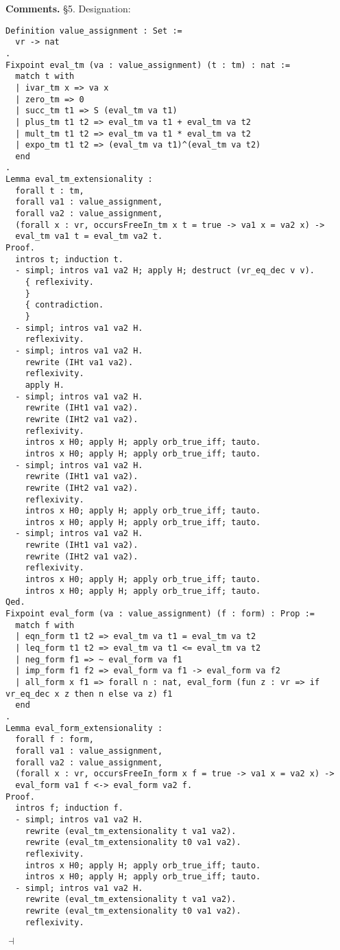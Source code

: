 \documentclass[12pt]{paper}
\newenvironment{context}[1][]{\noindent \textbf{{#1}.}}{\hfill $ \dashv $}
\begin{document}
\begin{context}[Comments]
    \S5. Designation:
\begin{lstlisting}[frame=single]
Definition value_assignment : Set :=
  vr -> nat
.
Fixpoint eval_tm (va : value_assignment) (t : tm) : nat :=
  match t with
  | ivar_tm x => va x
  | zero_tm => 0
  | succ_tm t1 => S (eval_tm va t1)
  | plus_tm t1 t2 => eval_tm va t1 + eval_tm va t2
  | mult_tm t1 t2 => eval_tm va t1 * eval_tm va t2
  | expo_tm t1 t2 => (eval_tm va t1)^(eval_tm va t2)
  end
.
Lemma eval_tm_extensionality :
  forall t : tm,
  forall va1 : value_assignment,
  forall va2 : value_assignment,
  (forall x : vr, occursFreeIn_tm x t = true -> va1 x = va2 x) ->
  eval_tm va1 t = eval_tm va2 t.
Proof.
  intros t; induction t.
  - simpl; intros va1 va2 H; apply H; destruct (vr_eq_dec v v).
    { reflexivity.
    }
    { contradiction.
    }
  - simpl; intros va1 va2 H.
    reflexivity.
  - simpl; intros va1 va2 H.
    rewrite (IHt va1 va2).
    reflexivity.
    apply H.
  - simpl; intros va1 va2 H.
    rewrite (IHt1 va1 va2).
    rewrite (IHt2 va1 va2).
    reflexivity.
    intros x H0; apply H; apply orb_true_iff; tauto.
    intros x H0; apply H; apply orb_true_iff; tauto.
  - simpl; intros va1 va2 H.
    rewrite (IHt1 va1 va2).
    rewrite (IHt2 va1 va2).
    reflexivity.
    intros x H0; apply H; apply orb_true_iff; tauto.
    intros x H0; apply H; apply orb_true_iff; tauto.
  - simpl; intros va1 va2 H.
    rewrite (IHt1 va1 va2).
    rewrite (IHt2 va1 va2).
    reflexivity.
    intros x H0; apply H; apply orb_true_iff; tauto.
    intros x H0; apply H; apply orb_true_iff; tauto.
Qed.
Fixpoint eval_form (va : value_assignment) (f : form) : Prop :=
  match f with
  | eqn_form t1 t2 => eval_tm va t1 = eval_tm va t2
  | leq_form t1 t2 => eval_tm va t1 <= eval_tm va t2
  | neg_form f1 => ~ eval_form va f1
  | imp_form f1 f2 => eval_form va f1 -> eval_form va f2
  | all_form x f1 => forall n : nat, eval_form (fun z : vr => if vr_eq_dec x z then n else va z) f1
  end
.
Lemma eval_form_extensionality :
  forall f : form,
  forall va1 : value_assignment,
  forall va2 : value_assignment,
  (forall x : vr, occursFreeIn_form x f = true -> va1 x = va2 x) ->
  eval_form va1 f <-> eval_form va2 f.
Proof.
  intros f; induction f.
  - simpl; intros va1 va2 H.
    rewrite (eval_tm_extensionality t va1 va2).
    rewrite (eval_tm_extensionality t0 va1 va2).
    reflexivity.
    intros x H0; apply H; apply orb_true_iff; tauto.
    intros x H0; apply H; apply orb_true_iff; tauto.
  - simpl; intros va1 va2 H.
    rewrite (eval_tm_extensionality t va1 va2).
    rewrite (eval_tm_extensionality t0 va1 va2).
    reflexivity.

\end{lstlisting}
\end{context}
\end{document}
